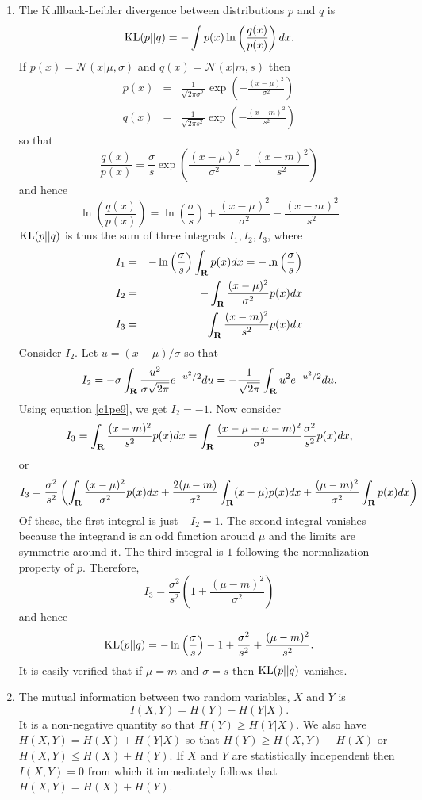 \begin{enumerate}
\item The Kullback-Leibler divergence between distributions $p$ and $q$ is
\[
\operatorname{KL}(p || q) = -\int p(x)\ln\left(\frac{q(x)}{p(x)}\right)dx.
\]
If $p(x) = \mathcal{N}(x|\mu,\sigma)$ and $q(x) = \mathcal{N}(x|m, s)$ then
\begin{eqnarray*}
p(x) &=& \frac{1}{\sqrt{2\pi\sigma^2}}\exp\left(-\frac{(x - \mu)^2}{\sigma^2}\right) \\
q(x) &=& \frac{1}{\sqrt{2\pi s^2}}\exp\left(-\frac{(x - m)^2}{s^2}\right)
\end{eqnarray*}
so that
\[
\frac{q(x)}{p(x)} = \frac{\sigma}{s}\exp\left(\frac{(x - \mu)^2}{\sigma^2} - \frac{(x - m)^2}{s^2}\right)
\]
and hence
\[
\ln\left(\frac{q(x)}{p(x)}\right) = \ln\left(\frac{\sigma}{s}\right) + \frac{(x - \mu)^2}{\sigma^2} - \frac{(x - m)^2}{s^2}
\]
$\operatorname{KL}(p||q)$ is thus the sum of three integrals $I_1, I_2, I_3$, where
\begin{eqnarray*}
I_1 &=& -\ln\left(\frac{\sigma}{s}\right)\int_{\mathbf{R}} p(x) dx = -\ln\left(\frac{\sigma}{s}\right) \\
I_2 &=& -\int_{\mathbf{R}} \frac{(x - \mu)^2}{\sigma^2} p(x)dx \\
I_3 &=& \int_{\mathbf{R}} \frac{(x - m)^2}{s^2}p(x)dx
\end{eqnarray*}
Consider $I_2$. Let $u = (x - \mu)/\sigma$ so that 
\[
I_2 = -\sigma\int_{\mathbf{R}} \frac{u^2}{\sigma\sqrt{2\pi}}e^{-u^2/2}du = -\frac{1}{\sqrt{2\pi}}\int_{\mathbf{R}} u^2 e^{-u^2/2}du.
\]
Using equation \eqref{c1pe9}, we get $I_2 = -1$.
Now consider
\[
I_3 = \int_{\mathbf{R}}\frac{(x - m)^2}{s^2}p(x)dx = \int_{\mathbf{R}}\frac{(x - \mu + \mu - m)^2}{\sigma^2}\frac{\sigma^2}{s^2}p(x)dx,
\]
or
\[
I_3 = \frac{\sigma^2}{s^2}\left(\int_{\mathbf{R}}\frac{(x - \mu)^2}{\sigma^2}p(x)dx + \frac{2(\mu - m)}{\sigma^2}\int_{\mathbf{R}} (x-\mu)p(x)dx + \frac{(\mu - m)^2}{\sigma^2}\int_{\mathbf{R}} p(x)dx\right)
\]
Of these, the first integral is just $-I_2 = 1$. The second integral vanishes because the integrand
is an odd function around $\mu$ and the limits are symmetric around it. The third integral is $1$ 
following the normalization property of $p$. Therefore,
\[
I_3 = \frac{\sigma^2}{s^2}\left(1 + \frac{(\mu - m)^2}{\sigma^2}\right)
\]
and hence
\[
\operatorname{KL}(p || q) = -\ln\left(\frac{\sigma}{s}\right) - 1 + \frac{\sigma^2}{s^2} + \frac{(\mu - m)^2}{s^2}.
\]
It is easily verified that if $\mu = m$ and $\sigma = s$ then $\operatorname{KL}(p || q)$ vanishes.

\item The mutual information between two random variables, $X$ and $Y$ is
\[
I(X, Y) = H(Y) - H(Y|X).
\]
It is a non-negative quantity so that $H(Y) \ge H(Y|X)$. We also have $H(X, Y) = H(X) + H(Y|X)$
so that $H(Y) \ge H(X, Y) - H(X)$ or $H(X, Y) \le H(X) + H(Y)$. If $X$ and $Y$ are statistically
independent then $I(X, Y) = 0$ from which it immediately follows that $H(X, Y) = H(X) + H(Y)$.


\end{enumerate}
